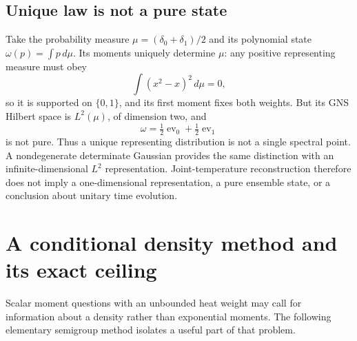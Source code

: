 \documentclass[11pt,a4paper]{article}
\theoremstyle{remark}\newtheorem{remark}[theorem]{Remark}
\begin{document}
\subsection{Unique law is not a pure state}
Take the probability measure $\mu=(\delta_0+\delta_1)/2$ and its polynomial state $\omega(p)=\int p\,d\mu$.
Its moments uniquely determine $\mu$: any positive representing measure must obey
\begin{equation}
 \int(x^2-x)^2\,d\mu=0,
\end{equation}
so it is supported on $\{0,1\}$, and its first moment fixes both weights.
But its GNS Hilbert space is $L^2(\mu)$, of dimension two, and
\begin{equation}
 \omega=\tfrac12\operatorname{ev}_0+\tfrac12\operatorname{ev}_1
\end{equation}
is not pure.
Thus a unique representing distribution is not a single spectral point.
A nondegenerate determinate Gaussian provides the same distinction with an infinite-dimensional $L^2$ representation.
Joint-temperature reconstruction therefore does not imply a one-dimensional representation, a pure ensemble state, or a conclusion about unitary time evolution.

\section{A conditional density method and its exact ceiling}\label{sec:density}
Scalar moment questions with an unbounded heat weight may call for information about a density rather than exponential moments.
The following elementary semigroup method isolates a useful part of that problem.
\end{document}
